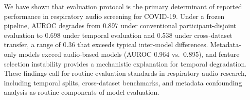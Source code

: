 \documentclass[conference]{IEEEtran}
\begin{document}
We have shown that evaluation protocol is the primary determinant of reported performance in respiratory audio screening for COVID-19. Under a frozen pipeline, AUROC degrades from 0.897 under conventional participant-disjoint evaluation to 0.698 under temporal evaluation and 0.538 under cross-dataset transfer, a range of 0.36 that exceeds typical inter-model differences. Metadata-only models exceed audio-based models (AUROC 0.964 vs.\ 0.895), and feature selection instability provides a mechanistic explanation for temporal degradation. These findings call for routine evaluation standards in respiratory audio research, including temporal splits, cross-dataset benchmarks, and metadata confounding analysis as routine components of model evaluation.



\end{document}
